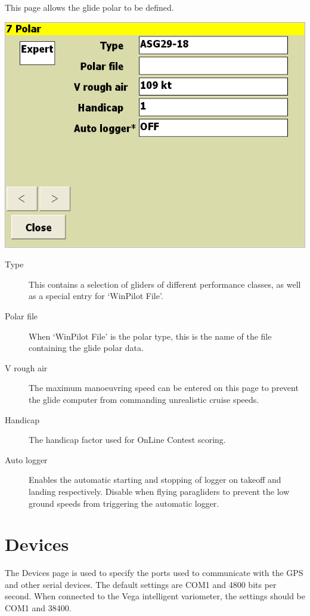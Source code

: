 \documentclass[a4paper,12pt]{refrep}
\begin{document}
This page allows the glide polar to be defined.

\begin{center}
\includegraphics[angle=0,width=\linewidth,keepaspectratio='true']{figures/config-5.png}
\end{center}

\begin{description}
\item[Type] 
This contains a selection of gliders of different performance
classes, as well as a special entry for `WinPilot File'.  
\item[Polar file]  When `WinPilot File' is the polar type, 
 this is the name of the file containing the glide polar data.
\item[V rough air] The maximum manoeuvring speed can be entered on this page to prevent the glide computer from commanding unrealistic cruise speeds.
\item[Handicap] The handicap factor used for OnLine Contest scoring.
\item[Auto logger] Enables the automatic starting and stopping of logger on takeoff and landing respectively.  Disable when flying paragliders to prevent the low ground speeds from triggering the automatic logger.
\end{description}

\clearpage
\section{Devices}

The Devices page is used to specify the ports used to communicate with
the GPS and other serial devices. The default settings are COM1 and
4800 bits per second.  When connected to the Vega intelligent
variometer, the settings should be COM1 and 38400.
\end{document}
